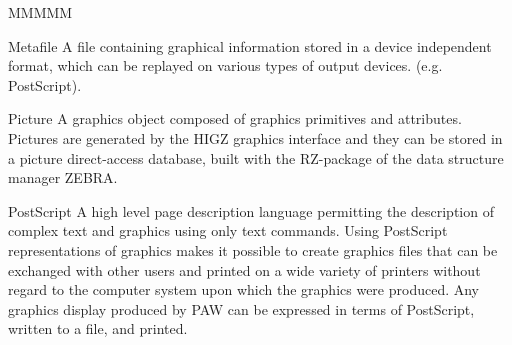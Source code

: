 \begin{DL}{MMMMM}
\item[Metafile]  A file containing graphical information
                 stored in a device independent format,
                 which can be replayed on various types of output devices.
                 (e.g. PostScript).
\item[Picture]   A graphics object composed of graphics primitives 
                 and attributes.
                 Pictures are generated by
                 the HIGZ graphics interface and they can be stored in a picture
                 direct-access database, built with the RZ-package of the
                 data structure manager ZEBRA.
\item[PostScript]
                 A high level page description language permitting the description of complex
                 text and graphics using only text commands.  Using PostScript
                 representations of graphics makes it possible to create graphics
                 files that can be exchanged with other users and printed on
                 a wide variety of printers without regard to the computer system
                 upon which the graphics were produced.  Any graphics display
                 produced by PAW can be expressed in terms of PostScript, written
                 to a file, and printed.
\end{DL}
 
\endinput
